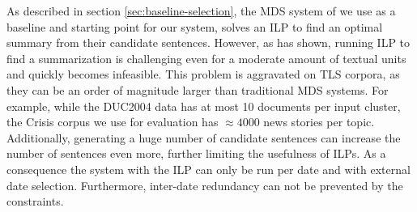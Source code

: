 \documentclass[a4paper,BCOR=10mm]{report}
\numberwithin{lemma}{chapter}
\numberwithin{definition}{chapter}
\begin{document}
%
%
%
%
%
%
%
%
%
%

As described in section \ref{sec:baseline-selection}, the MDS system of \citet{banerjee} we use as a baseline and starting point for our system, solves an ILP to find an optimal summary from their candidate sentences.
However, as \citet{mcdonald} has shown, running ILP to find a summarization is challenging even for a moderate amount of textual units and quickly becomes infeasible.
This problem is aggravated on TLS corpora, as they can be an order of magnitude larger than traditional MDS systems. For example, while the DUC2004 data has at most 10 documents per input cluster, the Crisis corpus we use for evaluation has $\approx 4000$ news stories per topic. Additionally, generating a huge number of candidate sentences can increase the number of sentences even more, further limiting the usefulness of ILPs. As a consequence the system with the ILP can only be run per date and with external date selection. Furthermore, inter-date redundancy can not be prevented by the constraints.
\end{document}
